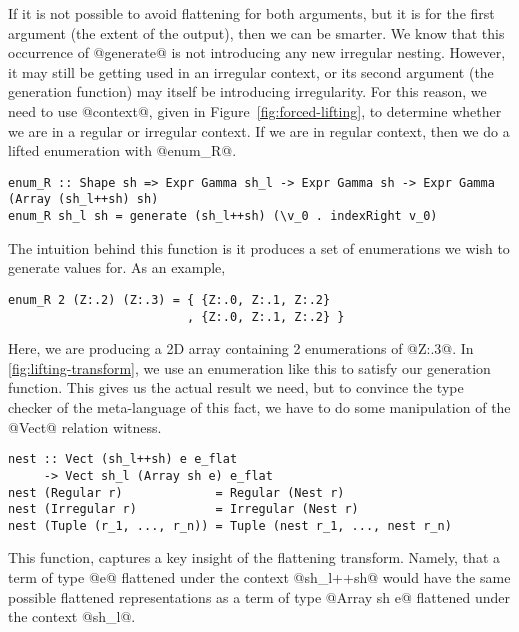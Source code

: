If it is not possible to avoid flattening for both arguments, but it is for the first argument (the extent of the output), then we can be smarter. We know that this occurrence of @generate@ is not introducing any new irregular nesting. However, it may still be getting used in an irregular context, or its second argument (the generation function) may itself be introducing irregularity. For this reason, we need to use @context@, given in Figure~\ref{fig:forced-lifting}, to determine whether we are in a regular or irregular context. If we are in regular context, then we do a lifted enumeration with @enum_R@.
%
\begin{lstlisting}[style=ndp]
enum_R :: Shape sh => Expr Gamma sh_l -> Expr Gamma sh -> Expr Gamma (Array (sh_l++sh) sh)
enum_R sh_l sh = generate (sh_l++sh) (\v_0 . indexRight v_0)
\end{lstlisting}
%
The intuition behind this function is it produces a set of enumerations we wish to generate values for. As an example,
%
\begin{lstlisting}[style=ndp]
enum_R 2 (Z:.2) (Z:.3) = { {Z:.0, Z:.1, Z:.2}
                         , {Z:.0, Z:.1, Z:.2} }
\end{lstlisting}
%
Here, we are producing a 2D array containing 2 enumerations of @Z:.3@. In \ref{fig:lifting-transform}, we use an enumeration like this to satisfy our generation function. This gives us the actual result we need, but to convince the type checker of the meta-language of this fact, we have to do some manipulation of the @Vect@ relation witness.
%
\begin{lstlisting}[style=ndp]
nest :: Vect (sh_l++sh) e e_flat
     -> Vect sh_l (Array sh e) e_flat
nest (Regular r)             = Regular (Nest r)
nest (Irregular r)           = Irregular (Nest r)
nest (Tuple (r_1, ..., r_n)) = Tuple (nest r_1, ..., nest r_n)
\end{lstlisting}
%
This function, captures a key insight of the flattening transform. Namely, that a term of type @e@ flattened under the context @sh_l++sh@ would have the same possible flattened representations as a term of type @Array sh e@ flattened under the context @sh_l@.

